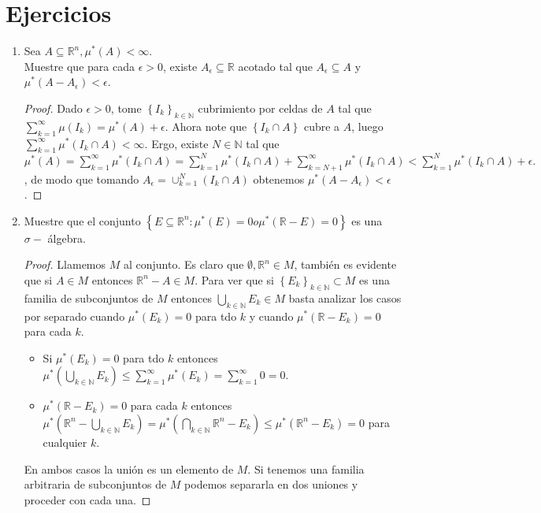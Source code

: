 \documentclass[spanish,12pt,a4paper,openany]{book}
\begin{document}
	\section{Ejercicios}
		\begin{enumerate}
			\item Sea $A \subseteq \mathbb{R}^{n}, \mu ^{*} (A) < \infty$.\\
			Muestre que para cada $\epsilon > 0$, existe $A_{\epsilon} \subseteq \mathbb{R}$ acotado tal que $A_{\epsilon} \subseteq A$ y $\mu ^{*} (A - A_{\epsilon}) < \epsilon$.
			
			\begin{proof}
				Dado $\epsilon > 0 $, tome $\left\{I_{k}\right\}_{k \in \mathbb{N}}$ cubrimiento por celdas de $A$ tal que $\sum_{k=1}^{\infty} \mu(I_{k}) = \mu^{*}(A) + \epsilon$. Ahora note que $\left\{I_{k} \cap A \right\}$ cubre a $A$, luego $\displaystyle \sum_{k=1}^{\infty} \mu^{*}(I_{k} \cap A) < \infty$. Ergo, existe $N \in \mathbb{N}$ tal que $\mu^{*}(A) = \displaystyle \sum_{k=1}^{\infty} \mu^{*}(I_{k} \cap A) = \displaystyle \sum_{k=1}^{N} \mu^{*}(I_{k} \cap A) + \displaystyle \sum_{k=N+1}^{\infty} \mu^{*}(I_{k} \cap A) < \displaystyle \sum_{k=1}^{N} \mu^{*}(I_{k} \cap A) + \epsilon.$, de modo que tomando $A_{\epsilon} = \cup_{k=1}^{N} (I_{k} \cap A)$ obtenemos $\mu^{*}(A - A_{\epsilon}) < \epsilon$.
			\end{proof}
			
			\item  Muestre que el conjunto $\left\{E \subseteq \mathbb{R} ^{n} : \mu^{*} (E)  = 0 o \mu^{*} (\mathbb{R} - E)  = 0 \right\}$ es una $\sigma-$ álgebra.
			\begin{proof}
				Llamemos $ M $ al conjunto. Es claro que $\emptyset, \mathbb{R}^{n} \in M$, también es evidente que si $A \in M$ entonces $\mathbb{R}^{n} - A \in M$. Para ver que si $\left\{ E_{k}\right\}_{k \in \mathbb{N}} \subset M$ es una familia de subconjuntos de $M$ entonces $\bigcup_{k \in \mathbb{N}} E_{k} \in M$ basta analizar los casos por separado cuando $\mu^{*} (E_{k}) = 0$ para tdo $k$ y cuando $\mu^{*}(\mathbb{R}-E_{k}) = 0$ para cada $k$.\\
				
				\begin{itemize}
					\item Si  $\mu^{*} (E_{k}) = 0$ para tdo $k$  entonces $\mu^{*}(\bigcup_{k \in \mathbb{N}} E_{k}) \leq \sum_{k=1}^{\infty} \mu ^{*}(E_{k}) = \sum_{k=1}^{\infty} 0 = 0$.
					
					\item $\mu^{*}(\mathbb{R}-E_{k}) = 0$ para cada $k$ entonces $\mu^{*}(\mathbb{R}^{n} - \bigcup_{k \in \mathbb{N}} E_{k}) = \mu^{*}(\bigcap_{k \in \mathbb{N}} \mathbb{R}^{n} - E_{k}) \leq \mu^{*}(\mathbb{R}^{n} - E_{k}) = 0$ para cualquier $k$.				
				\end{itemize}   
				En ambos casos la unión es un elemento de $M$. Si tenemos una familia arbitraria de subconjuntos de $M$ podemos separarla en dos uniones y proceder con cada una. 
			\end{proof}
			

\end{enumerate}
\end{document}
